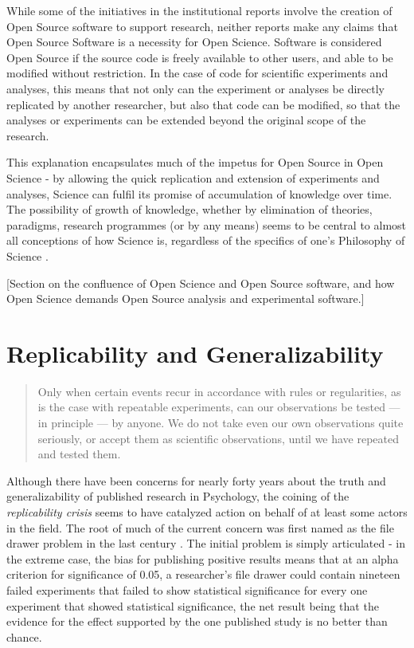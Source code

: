 \documentclass[12pt,a4paper,titlepage]{scrreprt}
\begin{document}
While some of the initiatives in the institutional reports involve the creation of Open Source software to support research, neither reports make any claims that Open Source Software is a necessity for Open Science. Software is considered Open Source if the source code is freely available to other users, and able to be modified without restriction. In the case of code for scientific experiments and analyses, this means that not only can the experiment or analyses be directly replicated by another researcher, but also that code can be modified, so that the analyses or experiments can be extended beyond the original scope of the research.

This explanation encapsulates much of the impetus for Open Source in Open Science - by allowing the quick replication and extension of experiments and analyses, Science can fulfil its promise of accumulation of knowledge over time. The possibility of growth of knowledge, whether by elimination of theories, paradigms, research programmes (or by any means) seems to be central to almost all conceptions of how Science is, regardless of the specifics of one's Philosophy of Science  \parencite{popper_logic_1959,kuhn_structure_1962,lakatos_criticism_1970,feyerabend_science_1978}.


[Section on the confluence of Open Science and Open Source software, and how Open Science demands Open Source analysis and experimental software.]
\section{Replicability and Generalizability}

\begin{quote}
Only when certain events recur in accordance with rules or regularities, as is the case with
repeatable experiments, can our observations be tested — in principle — by anyone. We do not take even our own observations quite seriously, or accept them as scientific observations, until we have repeated and tested them. \parencite[p.~23]{popper_logic_1959}
\end{quote}

Although there have been concerns for nearly forty years \parencite{greenwald_consequences_1975} about the truth and generalizability of published research in Psychology, the coining of the \textit{replicability crisis} \parencite{pashler_editors_2012} seems to have catalyzed action on behalf of at least some actors in the field. The root of much of the current concern was first named as the file drawer problem in the last century \parencite{rosenthal_file_1979}. The initial problem is simply articulated - in the extreme case, the bias for publishing positive results means that at an alpha criterion for significance of 0.05, a researcher's file drawer could contain nineteen failed experiments that failed to show statistical significance for every one experiment that showed statistical significance, the net result being that the evidence for the effect supported by the one published study is no better than chance.
\end{document}
